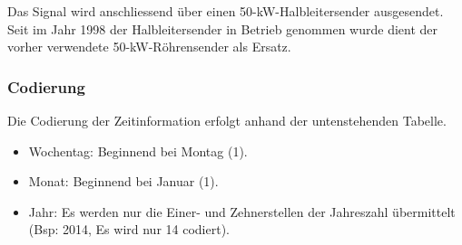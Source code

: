 Das Signal wird anschliessend über einen 50-kW-Halbleitersender ausgesendet. Seit im Jahr 1998 der Halbleitersender in Betrieb genommen wurde dient der vorher verwendete 50-kW-Röhrensender als Ersatz.

\begin{figure}
\end{figure}

\subsubsection{Codierung}
Die Codierung der Zeitinformation erfolgt anhand der untenstehenden Tabelle.

\begin{itemize}
\item Wochentag: Beginnend bei Montag (1).
\item Monat: Beginnend bei Januar (1).
\item Jahr: Es werden nur die Einer- und Zehnerstellen der Jahreszahl übermittelt (Bsp: 2014, Es wird nur 14 codiert).
\end{itemize}

